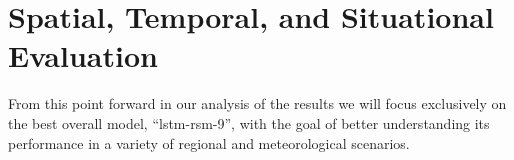 %
%

%
%

%
%

\section{Spatial, Temporal, and Situational Evaluation}

From this point forward in our analysis of the results we will focus exclusively on the best overall model, ``lstm-rsm-9'', with the goal of better understanding its performance in a variety of regional and meteorological scenarios.

